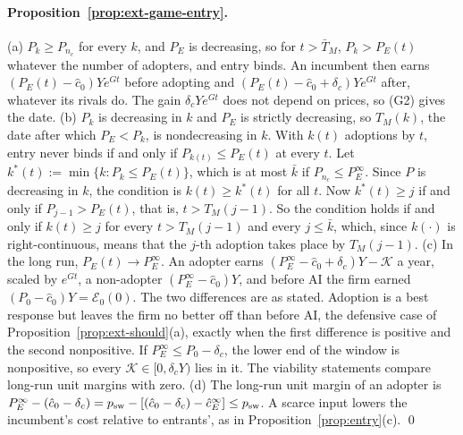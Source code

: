 \paragraph{Proposition~\ref{prop:ext-game-entry}.} (a) $P_k\ge P_{n_c}$ for every $k$, and $P_E$ is decreasing, so for $t>\bar T_M$, $P_k>P_E(t)$ whatever the number of adopters, and entry binds. An incumbent then earns $(P_E(t)-\hat c_0)Ye^{Gt}$ before adopting and $(P_E(t)-\hat c_0+\delta_c)Ye^{Gt}$ after, whatever its rivals do. The gain $\delta_cYe^{Gt}$ does not depend on prices, so (G2) gives the date. (b) $P_k$ is decreasing in $k$ and $P_E$ is strictly decreasing, so $T_M(k)$, the date after which $P_E<P_k$, is nondecreasing in $k$. With $k(t)$ adoptions by $t$, entry never binds if and only if $P_{k(t)}\le P_E(t)$ at every $t$. Let $k^*(t):=\min\{k:P_k\le P_E(t)\}$, which is at most $\bar k$ if $P_{n_c}\le P_E^\infty$. Since $P$ is decreasing in $k$, the condition is $k(t)\ge k^*(t)$ for all $t$. Now $k^*(t)\ge j$ if and only if $P_{j-1}>P_E(t)$, that is, $t>T_M(j-1)$. So the condition holds if and only if $k(t)\ge j$ for every $t>T_M(j-1)$ and every $j\le\bar k$, which, since $k(\cdot)$ is right-continuous, means that the $j$-th adoption takes place by $T_M(j-1)$. (c) In the long run, $P_E(t)\to P_E^\infty$. An adopter earns $(P_E^\infty-\hat c_0+\delta_c)Y-\mathcal K$ a year, scaled by $e^{Gt}$, a non-adopter $(P_E^\infty-\hat c_0)Y$, and before AI the firm earned $(P_0-\hat c_0)Y=\mathcal E_0(0)$. The two differences are as stated. Adoption is a best response but leaves the firm no better off than before AI, the defensive case of Proposition~\ref{prop:ext-should}(a), exactly when the first difference is positive and the second nonpositive. If $P_E^\infty\le P_0-\delta_c$, the lower end of the window is nonpositive, so every $\mathcal K\in[0,\delta_cY)$ lies in it. The viability statements compare long-run unit margins with zero. (d) The long-run unit margin of an adopter is $P_E^\infty-(\hat c_0-\delta_c)=p_{\rm sw}-[(\hat c_0-\delta_c)-\hat c_E^\infty]\le p_{\rm sw}$. A scarce input lowers the incumbent's cost relative to entrants', as in Proposition~\ref{prop:entry}(c). \qed


